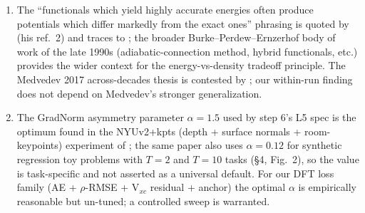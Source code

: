 \documentclass[11pt,letterpaper]{article}
\begin{document}
\begin{enumerate}
\item The ``functionals which yield highly accurate energies often produce
potentials which differ markedly from the exact ones'' phrasing is quoted by
\citet{Kepp2017} (his ref.~2) and traces to \citet{CruzLamBurke1998}; the broader
Burke--Perdew--Ernzerhof body of work of the late 1990s
(adiabatic-connection method, hybrid functionals, etc.) provides the wider
context for the energy-vs-density tradeoff principle. The Medvedev 2017 across-decades thesis
\citep{Medvedev2017} is contested by \citet{Kepp2017}; our within-run finding does not
depend on Medvedev's stronger generalization.

\item The GradNorm asymmetry parameter $\alpha = 1.5$
\citep{ChenGradNorm2018} used by step 6's L5 spec is the optimum found
in the NYUv2+kpts (depth + surface normals + room-keypoints) experiment
of \citet[Table~2 and \S\S 5.2--5.4]{ChenGradNorm2018}; the same paper
also uses $\alpha = 0.12$ for synthetic regression toy problems with
$T = 2$ and $T = 10$ tasks (\S 4, Fig.~2), so the value is task-specific and not asserted
as a universal default. For our DFT loss family (AE +
$\rho$-RMSE + V$_{xc}$ residual + anchor) the optimal $\alpha$ is
empirically reasonable but un-tuned; a controlled sweep is warranted.
\end{enumerate}



\end{document}
